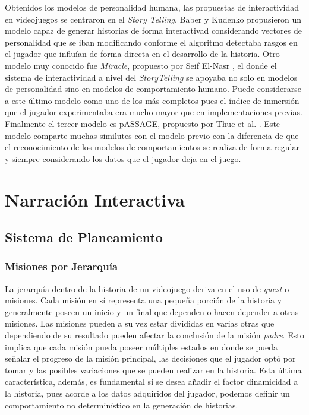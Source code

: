\documentclass[conference]{IEEEtran}
\begin{document}
Obtenidos los modelos de personalidad humana, las propuestas de interactividad en videojuegos se centraron en el \textit{Story Telling}. Baber y Kudenko \citep{barber2007user} propusieron un modelo capaz de generar historias de forma interactivad considerando vectores de personalidad que se iban modificando conforme el algoritmo detectaba rasgos en el jugador que influían de forma directa en el desarrollo de la historia. Otro modelo muy conocido fue \textit{Miracle}, propuesto por Seif El-Nasr \citep{el2007interaction}, el donde el sistema de interactividad  a nivel del \textit{StoryTelling} se apoyaba no solo en modelos de personalidad sino en modelos de comportamiento humano. Puede considerarse a este último modelo como uno de los más completos pues el índice de inmersión que el jugador experimentaba era mucho mayor que en implementaciones previas.  Finalmente el tercer modelo es pASSAGE, propuesto por Thue et al. \citep{thue2007interactive}. Este modelo comparte muchas similutes con el modelo previo con la diferencia de que el reconocimiento de los modelos de comportamientos se realiza de forma regular y siempre considerando los datos que el jugador deja en el juego. 



\section{Narración Interactiva}

\subsection{Sistema de Planeamiento}

\subsubsection{Misiones por Jerarquía}

La jerarquía dentro de la historia de un videojuego deriva en el uso de \textit{quest} o misiones. Cada misión en sí representa una pequeña porción de la historia y generalmente poseen un inicio y un final que dependen o hacen depender a otras misiones. Las misiones pueden a su vez estar divididas en varias otras que dependiendo de su resultado pueden afectar la conclusión de la misión \textit{padre}. Esto implica que cada misión pueda poseer múltiples estados en donde se pueda señalar el progreso de la misión principal, las decisiones que el jugador optó por tomar y las posibles variaciones que se pueden realizar en la historia. Esta última característica, además, es fundamental si se desea añadir el factor dinamicidad a la historia, pues 
acorde a los datos adquiridos del jugador, podemos definir un comportamiento no determinístico en la generación de historias.
\end{document}
